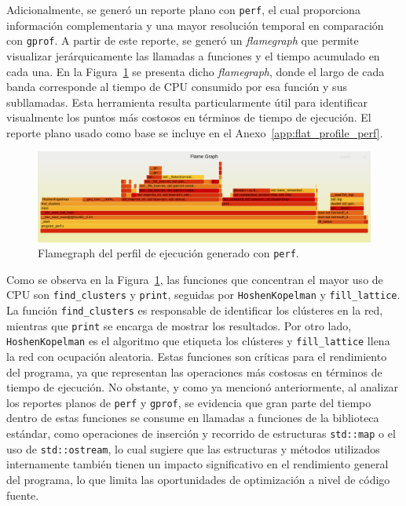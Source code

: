 \documentclass{article}
\begin{document}
Adicionalmente, se generó un reporte plano con \texttt{perf}, el cual proporciona información complementaria y una mayor resolución temporal en comparación con \texttt{gprof}. A partir de este reporte, se generó un \textit{flamegraph} que permite visualizar jerárquicamente las llamadas a funciones y el tiempo acumulado en cada una. En la Figura~\ref{fig:flamegraph} se presenta dicho \textit{flamegraph}, donde el largo de cada banda corresponde al tiempo de CPU consumido por esa función y sus subllamadas. Esta herramienta resulta particularmente útil para identificar visualmente los puntos más costosos en términos de tiempo de ejecución. El reporte plano usado como base se incluye en el Anexo~\ref{app:flat_profile_perf}.

\begin{figure}[h!]
    \centering
    \includegraphics[width=1.0\textwidth]{figures/flamegraph.pdf}
    \caption{Flamegraph del perfil de ejecución generado con \texttt{perf}.}
    \label{fig:flamegraph}
\end{figure}

Como se observa en la Figura~\ref{fig:flamegraph}, las funciones que concentran el mayor uso de CPU son \texttt{find\_clusters} y \texttt{print}, seguidas por \texttt{HoshenKopelman} y \texttt{fill\_lattice}. La función \texttt{find\_clusters} es responsable de identificar los clústeres en la red, mientras que \texttt{print} se encarga de mostrar los resultados. Por otro lado, \texttt{HoshenKopelman} es el algoritmo que etiqueta los clústeres y \texttt{fill\_lattice} llena la red con ocupación aleatoria. Estas funciones son críticas para el rendimiento del programa, ya que representan las operaciones más costosas en términos de tiempo de ejecución. No obstante, y como ya mencionó anteriormente, al analizar los reportes planos de \texttt{perf} y \texttt{gprof}, se evidencia que gran parte del tiempo dentro de estas funciones se consume en llamadas a funciones de la biblioteca estándar, como operaciones de inserción y recorrido de estructuras \texttt{std::map} o el uso de \texttt{std::ostream}, lo cual sugiere que las estructuras y métodos utilizados internamente también tienen un impacto significativo en el rendimiento general del programa, lo que limita las oportunidades de optimización a nivel de código fuente.
\end{document}
